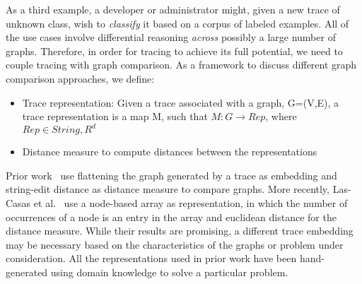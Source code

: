 
As a third example, a developer or administrator might, given a new trace of unknown class, wish to \emph{classify} it based on a corpus of labeled examples. All of the use cases involve differential reasoning \emph{across} possibly a large number of graphs. Therefore, in order for tracing to achieve its full potential, we need to couple tracing with graph comparison. As a framework to discuss different graph comparison approaches, we define:
\begin{itemize}
\item Trace representation: \newline
Given a trace associated with a graph, G=(V,E), a trace representation is a map M, such that \newline
$M\colon G \rightarrow Rep$, where $Rep \in String, R^{d}$
\item Distance measure to compute distances between the representations
\end{itemize}
Prior work~\cite{Barham:2003:MOM:1251054.1251069, Sambasivan:2011:DPC:1972457.1972463} use flattening the graph generated by a trace as embedding and string-edit distance as distance measure to compare graphs. More recently, Las-Casas et al.~\cite{Las-Casas:2018:WSE:3267809.3267841} use a node-based array as representation, in which the number of occurrences of a node is an entry in the array and euclidean distance for the distance measure. While their results are promising, a different trace embedding may be necessary based on the characteristics of the graphs or problem under consideration. All the representations used in prior work have been hand-generated using domain knowledge to solve a particular problem.

